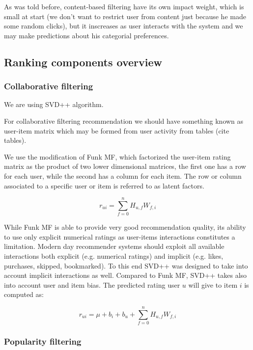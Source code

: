 \documentclass{article}
\begin{document}
As was told before, content-based filtering have its own impact weight, which is small at start (we don't want to restrict user from content just because he made some random clicks), but it inscreases as user interacts with the system and we may make predictions about his categorial preferences.

\subsection{Ranking components overview}



\subsubsection{Collaborative filtering}

We are using SVD++ algorithm.

For collaborative filtering recommendation we should have something known as user-item matrix which may be formed from user activity from tables (cite tables).

We use the modification of Funk MF, which factorized the user-item rating matrix as the product of two lower dimensional matrices, the first one has a row for each user, while the second has a column for each item. The row or column associated to a specific user or item is referred to as latent factors.

\begin{equation}
    r_{u i}=\sum_{f=0}^{n } H_{u, f} W_{f, i}
\end{equation}


While Funk MF is able to provide very good recommendation quality, its ability to use only explicit numerical ratings as user-items interactions constitutes a limitation. Modern day recommender systems should exploit all available interactions both explicit (e.g. numerical ratings) and implicit (e.g. likes, purchases, skipped, bookmarked). To this end SVD++ was designed to take into account implicit interactions as well.  Compared to Funk MF, SVD++ takes also into account user and item bias.
The predicted rating user $u$ will give to item $i$ is computed as:

\begin{equation}
    r_{u i}=\mu+b_{i}+b_{u}+\sum_{f=0}^{n} H_{u, f} W_{f, i}
\end{equation}



\subsubsection{Popularity filtering}
\end{document}
